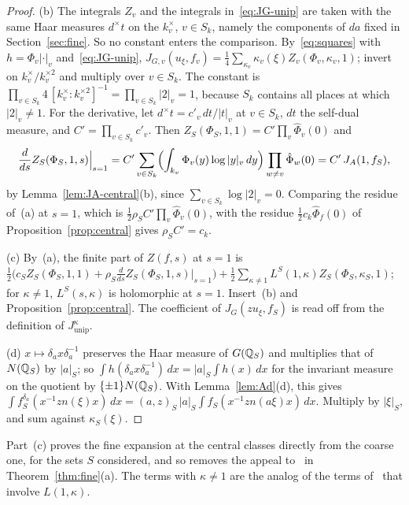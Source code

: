 \begin{proof}
(b) The integrals $Z_v$ and the integrals in~\eqref{eq:JG-unip} are taken
with the same Haar measures $d^\times t$ on the $k_v^\times$, $v\in S_k$,
namely the components of $da$ fixed in Section~\ref{sec:fine}. So no
constant enters the comparison. By~\eqref{eq:squares} with $h=\Phi_v|\cdot|_v$ and~\eqref{eq:JG-unip},
$J_{G,v}(u_\xi,f_v)=\frac14\sum_{\kappa_v}\kappa_v(\xi)Z_v(\Phi_v,\kappa_v,
1)$; invert on $k_v^\times/k_v^{\times2}$ and multiply over $v\in S_k$. The
constant is $\prod_{v\in S_k}4\,[k_v^\times:k_v^{\times2}]^{-1}=\prod_{v\in
S_k}|2|_v=1$, because $S_k$ contains all places at which $|2|_v\ne1$. For
the derivative, let $d^\times t=c'_v\,dt/|t|_v$ at $v\in S_k$, $dt$ the
self-dual measure, and $C'=\prod_{v\in S_k}c'_v$. Then
$Z_S(\Phi_S,1,1)=C'\prod_v\hat\Phi_v(0)$ and
\[
\frac{d}{ds}Z_S(\Phi_S,1,s)\Big|_{s=1}=C'\sum_{v\in S_k}\Bigl(\int_{k_v}
\Phi_v(y)\log|y|_v\,dy\Bigr)\prod_{w\ne v}\hat\Phi_w(0)=C'\,J_A(1,f_S),
\]
by Lemma~\ref{lem:JA-central}(b), since $\sum_{v\in S_k}\log|2|_v=0$.
Comparing the residue of~(a) at $s=1$, which is $\frac12\rho_SC'
\prod_v\hat\Phi_v(0)$, with the residue $\frac12c_k\hat\Phi_f(0)$ of
Proposition~\ref{prop:central} gives $\rho_SC'=c_k$.

(c) By~(a), the finite part of $Z(f,s)$ at $s=1$ is $\frac12\bigl(c_S
Z_S(\Phi_S,1,1)+\rho_S\frac{d}{ds}Z_S(\Phi_S,1,s)|_{s=1}\bigr)+\frac12
\sum_{\kappa\ne1}L^S(1,\kappa)Z_S(\Phi_S,\kappa_S,1)$; for $\kappa\ne1$,
$L^S(s,\kappa)$ is holomorphic at $s=1$. Insert~(b) and
Proposition~\ref{prop:central}. The coefficient of $J_G(zu_\xi,f_S)$ is
read off from the definition of $J^\kappa_{\mathrm{unip}}$.

(d) $x\mapsto\delta_ax\delta_a^{-1}$ preserves the Haar measure of
$G(\mathbb{Q}_S)$ and multiplies that of $N(\mathbb{Q}_S)$ by $|a|_S$; so
$\int h(\delta_ax\delta_a^{-1})\,dx=|a|_S\int h(x)\,dx$ for the invariant
measure on the quotient by $\{\pm1\}N(\mathbb{Q}_S)$. With Lemma~\ref{lem:Ad}(d),
this gives $\int f_S^{\delta_a}(
x^{-1}zn(\xi)x)\,dx=(a,z)_S\,|a|_S\int f_S(x^{-1}zn(a\xi)x)\,dx$. Multiply
by $|\xi|_S$, and sum against $\kappa_S(\xi)$.
\end{proof}

Part~(c) proves the fine expansion at the central classes directly from
the coarse one, for the sets $S$ considered, and so removes the appeal
to~\cite{Ar86,Li14a} in Theorem~\ref{thm:fine}(a). The terms with
$\kappa\ne1$ are the analog of the terms of~\cite[\S5]{LL79} that involve
$L(1,\kappa)$.

